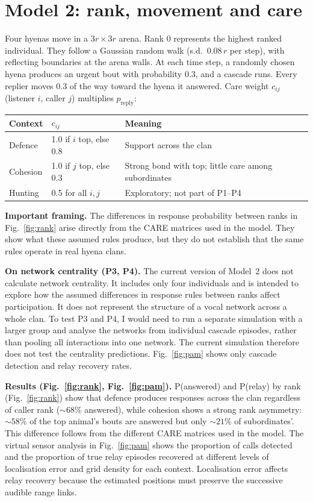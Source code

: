\documentclass[11pt,a4paper]{article}
\begin{document}
\section*{Model 2: rank, movement and care}

Four hyenas move in a $3r \times 3r$ arena. Rank 0 represents the highest ranked
individual. They follow a Gaussian random walk (s.d.\ $0.08\,r$ per step), with
reflecting boundaries at the arena walls. At each time step, a randomly chosen
hyena produces an urgent bout with probability 0.3, and a cascade runs.
Every replier moves 0.3 of the way toward the hyena it answered. Care weight
$c_{ij}$ (listener $i$, caller $j$) multiplies $p_{\text{reply}}$:

\begin{center}\small
\begin{tabular}{lll}\toprule
Context  & $c_{ij}$                     & Meaning\\\midrule
Defence  & 1.0 if $i$ top, else 0.8     & Support across the clan\\
Cohesion & 1.0 if $j$ top, else 0.3     & Strong bond with top; little care among subordinates\\
Hunting  & 0.5 for all $i,j$            & Exploratory; not part of P1--P4\\
\bottomrule
\end{tabular}
\end{center}

\textbf{Important framing.} The differences in response probability between ranks in Fig.~\ref{fig:rank} arise
directly from the CARE matrices used in the model. They show what these assumed
rules produce, but they do not establish that the same rules operate in real hyena
clans.

\textbf{On network centrality (P3, P4).} The current version of Model~2 does not calculate network centrality. It includes
only four individuals and is intended to explore how the assumed differences in
response rules between ranks affect participation. It does not represent the
structure of a vocal network across a whole clan. To test P3 and P4, I would need
to run a separate simulation with a larger group and analyse the networks from
individual cascade episodes, rather than pooling all interactions into one network.
The current simulation therefore does not test the centrality predictions.
Fig.~\ref{fig:pam} shows only cascade detection and relay recovery rates.

\textbf{Results (Fig.~\ref{fig:rank}, Fig.~\ref{fig:pam}).}
P(answered) and P(relay) by rank (Fig.~\ref{fig:rank}) show that defence produces
responses across the clan regardless of caller rank (${\sim}68\%$ answered), while cohesion
shows a strong rank asymmetry: ${\sim}58\%$ of the top animal's bouts are answered
but only ${\sim}21\%$ of subordinates'. This difference follows from the different CARE matrices used in the model. The
virtual sensor analysis in Fig.~\ref{fig:pam} shows the proportion of calls detected
and the proportion of true relay episodes recovered at different levels of
localisation error and grid density for each context. Localisation error affects
relay recovery because the estimated positions must preserve the successive
audible range links.
\end{document}
